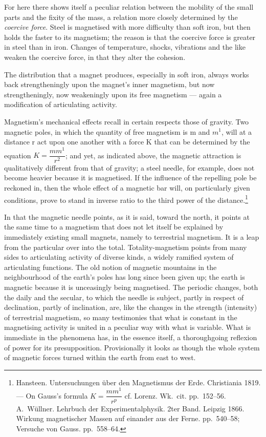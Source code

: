 \documentclass[12pt,a4paper]{book}
\begin{document}
For here there shows itself a peculiar relation between the mobility of the small parts and the fixity of the mass, a
relation more closely determined by the
\emph{coercive force}. Steel is magnetised with more difficulty than soft iron, but then holds the faster to its
magnetism; the reason is that the coercive force is greater in steel than in iron. Changes of temperature, shocks,
vibrations and the like weaken the coercive force, in that they alter the cohesion.

The distribution that a magnet produces, especially in soft iron, always works back strengtheningly upon the magnet's
inner magnetism, but now strengtheningly, now weakeningly upon its free magnetism --- again a modification of articulating
activity.

Magnetism's mechanical effects recall in certain respects those of gravity. Two magnetic poles, in which the quantity of
free magnetism is m and
$m^{1}$, will at a distance r act upon one another with a force K that can be determined by the equation
$K = \dfrac{mm^{1}}{r^{2}}$; and yet, as indicated above, the magnetic attraction is qualitatively different from that of
gravity; a steel needle, for example, does not become heavier because it is magnetised. If the influence of the repelling
pole be reckoned in, then the whole effect of a magnetic bar will, on
particularly given conditions, prove to stand in inverse ratio to the third power of the distance.\footnote{%
Hansteen. Untersuchungen über den Magnetismus der Erde. Christiania 1819. --- On Gauss's formula
$K = \dfrac{mm^{1}}{r^{p}}$ cf. Lorenz. Wk.\ cit. pp.\ 152--56. A.\ Wüllner. Lehrbuch der Experimentalphysik. 2ter Band.
Leipzig 1866. Wirkung magnetischer Massen auf einander aus der Ferne. pp.\ 540--58; Versuche von Gauss. pp.\ 558--64.}

In that the magnetic needle points, as it is said, toward the north, it points at the same time to a magnetism that does
not let itself be explained by immediately existing small magnets, namely to terrestrial magnetism. It is a leap from the
particular over into the total. Totality-magnetism points from many sides to articulating activity of diverse kinds, a
widely ramified system of articulating functions. The old notion of magnetic mountains in the neighbourhood of the earth's
poles has long since been given up; the earth is magnetic because it is unceasingly being magnetised. The periodic
changes, both the daily and the secular, to which the needle is subject, partly in respect of declination, partly of
inclination, are, like the changes in the strength (intensity) of terrestrial magnetism, so many testimonies that what is
constant in the magnetising activity is united in a peculiar way with what is variable. What is immediate in the phenomena
has, in the essence itself, a thoroughgoing reflexion of power for its presupposition. Provisionally it looks as though
the whole system of magnetic forces turned within the earth from east to west.
\end{document}
